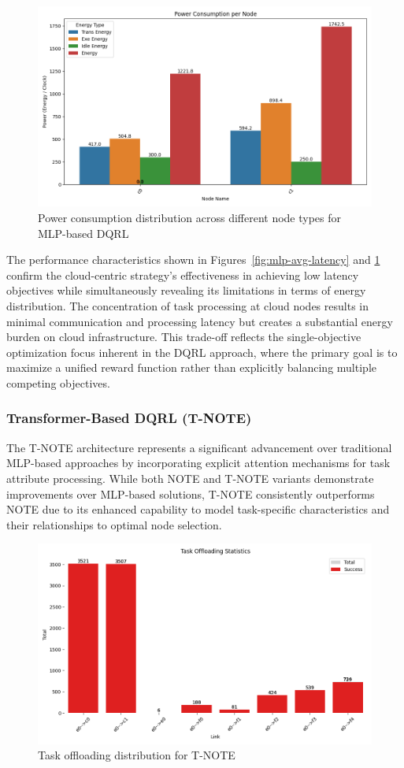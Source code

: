 \documentclass[preprint,12pt]{elsarticle}
\begin{document}
\begin{figure}[H]
    \centering
    \includegraphics[width=0.5\linewidth]{figs/mlp_power_consumption_per_node.png}
    \caption{Power consumption distribution across different node types for MLP-based DQRL}
    \label{fig:mlp-power-consumption}
\end{figure}

The performance characteristics shown in Figures~\ref{fig:mlp-avg-latency} and \ref{fig:mlp-power-consumption} confirm the cloud-centric strategy's effectiveness in achieving low latency objectives while simultaneously revealing its limitations in terms of energy distribution. The concentration of task processing at cloud nodes results in minimal communication and processing latency but creates a substantial energy burden on cloud infrastructure. This trade-off reflects the single-objective optimization focus inherent in the DQRL approach, where the primary goal is to maximize a unified reward function rather than explicitly balancing multiple competing objectives.

\subsubsection{Transformer-Based DQRL (T-NOTE)}
\label{subsubsec:T-NOTE-analysis}

The T-NOTE architecture represents a significant advancement over traditional MLP-based approaches by incorporating explicit attention mechanisms for task attribute processing. While both NOTE and T-NOTE variants demonstrate improvements over MLP-based solutions, T-NOTE consistently outperforms NOTE due to its enhanced capability to model task-specific characteristics and their relationships to optimal node selection.

\begin{figure}[H]
    \centering
    \includegraphics[width=0.5\linewidth]{figs/taskformer_offloading_statistics.png}
    \caption{Task offloading distribution for T-NOTE}
    \label{fig:T-NOTE-offloading-stats}
\end{figure}
\end{document}
